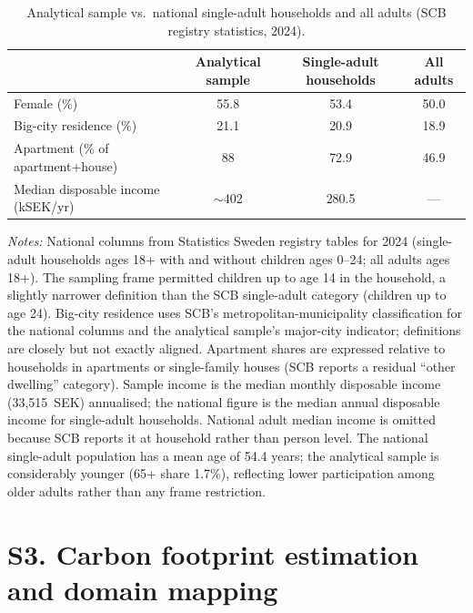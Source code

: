 \documentclass[12pt]{article}
\begin{document}
\begin{table}[!htbp]
\centering
\footnotesize
\caption{Analytical sample vs.\ national single-adult households and all adults (SCB registry statistics, 2024).}
\label{tab:national_comparison}
\begin{tabular}{lccc}
\toprule
 & Analytical sample & Single-adult households & All adults \\
\midrule
Female (\%)                        & 55.8 & 53.4 & 50.0 \\
Big-city residence (\%)            & 21.1 & 20.9 & 18.9 \\
Apartment (\% of apartment+house)  & 88   & 72.9 & 46.9 \\
Median disposable income (kSEK/yr) & $\sim$402 & 280.5 & --- \\
\bottomrule
\end{tabular}

\smallskip
{\footnotesize\raggedright
\textit{Notes:} National columns from Statistics Sweden registry tables for 2024 (single-adult households ages 18+ with and without children ages 0--24; all adults ages 18+). The sampling frame permitted children up to age 14 in the household, a slightly narrower definition than the SCB single-adult category (children up to age 24). Big-city residence uses SCB's metropolitan-municipality classification for the national columns and the analytical sample's major-city indicator; definitions are closely but not exactly aligned. Apartment shares are expressed relative to households in apartments or single-family houses (SCB reports a residual ``other dwelling'' category). Sample income is the median monthly disposable income (33{,}515~SEK) annualised; the national figure is the median annual disposable income for single-adult households. National adult median income is omitted because SCB reports it at household rather than person level. The national single-adult population has a mean age of 54.4 years; the analytical sample is considerably younger (65+ share 1.7\%), reflecting lower participation among older adults rather than any frame restriction.\par}
\end{table}

\section*{S3. Carbon footprint estimation and domain mapping}
\end{document}
